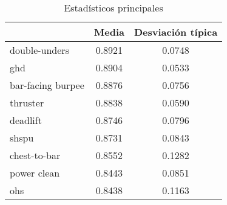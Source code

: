 \begin{table}[H]
\centering
\caption{Estadísticos principales }
\label{table_probabilities}
\begin{tabular}{lcc}
\toprule
{} &   Media &  Desviación típica \\
\midrule
double-unders     &  0.8921 &             0.0748 \\
ghd               &  0.8904 &             0.0533 \\
bar-facing burpee &  0.8876 &             0.0756 \\
thruster          &  0.8838 &             0.0590 \\
deadlift          &  0.8746 &             0.0796 \\
shspu             &  0.8731 &             0.0843 \\
chest-to-bar      &  0.8552 &             0.1282 \\
power clean       &  0.8443 &             0.0851 \\
ohs               &  0.8438 &             0.1163 \\
\bottomrule
\end{tabular}
\end{table}
